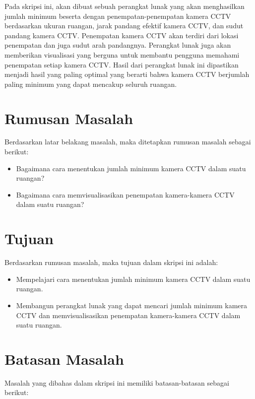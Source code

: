 Pada skripsi ini, akan dibuat sebuah perangkat lunak yang akan menghasilkan jumlah minimum beserta dengan penempatan-penempatan kamera CCTV berdasarkan ukuran ruangan, jarak pandang efektif kamera CCTV, dan sudut pandang kamera CCTV. Penempatan kamera CCTV akan terdiri dari lokasi penempatan dan juga sudut arah pandangnya. Perangkat lunak juga akan memberikan visualisasi yang berguna untuk membantu pengguna memahami penempatan setiap kamera CCTV. Hasil dari perangkat lunak ini dipastikan menjadi hasil yang paling optimal yang berarti bahwa kamera CCTV berjumlah paling minimum yang dapat mencakup seluruh 	ruangan.

\section{Rumusan Masalah}
\label{sec:rumusan}

Berdasarkan latar belakang masalah, maka ditetapkan rumusan masalah sebagai berikut:

\begin{itemize}
	\item Bagaimana cara menentukan jumlah minimum kamera CCTV dalam suatu ruangan?
	\item Bagaimana cara memvisualisasikan penempatan kamera-kamera CCTV dalam suatu ruangan?
\end{itemize}

\section{Tujuan}
\label{sec:tujuan}

Berdasarkan rumusan masalah, maka tujuan dalam skripsi ini adalah:

\begin{itemize}
	\item Mempelajari cara menentukan jumlah minimum kamera CCTV dalam suatu ruangan.
	\item Membangun perangkat lunak yang dapat mencari jumlah minimum kamera CCTV dan memvisualisasikan penempatan kamera-kamera CCTV dalam suatu ruangan.
\end{itemize}

\section{Batasan Masalah}
\label{sec:batasan}

Masalah yang dibahas dalam skripsi ini memiliki batasan-batasan sebagai berikut:

